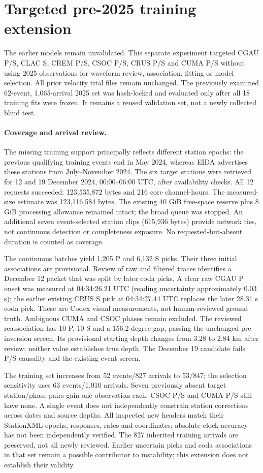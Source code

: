\section{Targeted pre-2025 training extension}
The earlier models remain unvalidated. This separate experiment targeted CGAU P/S,
CLAC S, CREM P/S, CSOC P/S, CRUS P/S and CUMA P/S without using 2025 observations
for waveform review, association, fitting or model selection. All prior velocity
trial files remain unchanged. The previously examined 62-event, 1,065-arrival
2025 set was hash-locked and evaluated only after all 18 training fits were frozen.
It remains a reused validation set, not a newly collected blind test.

\paragraph{Coverage and arrival review.}
The missing training support principally reflects different station epochs:
the previous qualifying training events end in May 2024, whereas EIDA advertises
these stations from July--November 2024. The six target stations were retrieved
for 12 and 19 December 2024, 00:00--06:00 UTC, after availability checks.
All 12 requests succeeded: 123,535,872 bytes and 216 core channel-hours.
The measured-size estimate was 123,116,584 bytes. The existing 40 GiB free-space
reserve plus 8 GiB processing allowance remained intact; the broad queue was stopped.
An additional seven event-selected station clips (615,936 bytes) provide network
ties, not continuous detection or completeness exposure.
No requested-but-absent duration is counted as coverage.

The continuous batches yield 1,205 P and 6,132 S picks. Their three initial associations are provisional.
Review of raw and filtered traces identifies a December 12 packet that was split
by later coda picks. A clear raw CGAU P onset was measured at 04:34:26.21 UTC
(reading uncertainty approximately 0.03 s); the earlier existing CRUS S pick
at 04:34:27.44 UTC replaces the later 28.31 s coda pick. These are Codex visual
measurements, not human-reviewed ground truth. Ambiguous CUMA and CSOC phases
remain excluded. The reviewed reassociation has 10 P, 10 S and a 156.2-degree
gap, passing the unchanged pre-inversion screen. Its provisional starting depth
changes from 3.28 to 2.84 km after review; neither value establishes true depth.
The December 19 candidate fails P/S causality and the existing event screen.

The training set increases from 52 events/827 arrivals to 53/847; the selection
sensitivity uses 63 events/1,010 arrivals. Seven previously absent target
station/phase pairs gain one observation each. CSOC P/S and CUMA P/S still have
none. A single event does not independently constrain station corrections across
dates and source depths. All inspected new headers match their StationXML epochs,
responses, rates and coordinates; absolute clock accuracy has not been independently verified.
The 827 inherited training arrivals are preserved, not all newly reviewed.
Earlier uncertain picks and coda associations in that set remain a possible
contributor to instability; this extension does not establish their validity.


